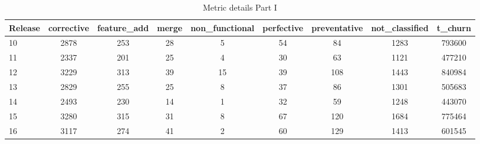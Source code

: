 \appendix{}
\label{sec:appendix}

\begin{table*}[!hbt]
      \begin{center}
            \caption{Metric details Part I}
            \label{tab:metrics_details_1}
            \begin{tabular}{l| c c c c c c c c}
            \toprule
            \textbf{Release}  & \textbf{corrective} & \textbf{feature\_add} & \textbf{merge} & \textbf{non\_functional} & \textbf{perfective} & \textbf{preventative}  & \textbf{not\_classified}  & \textbf{t\_churn} \\ \midrule  
                  10          &                       2878 &                         253 &                    28 &                              5 &                         54 &                            84 &                     1283 &   793600 \\
                  11          &                       2337 &                         201 &                    25 &                              4 &                         30 &                            63 &                     1121 &   477210 \\
                  12          &                       3229 &                         313 &                    39 &                             15 &                         39 &                           108 &                     1443 &   840984 \\
                  13          &                       2829 &                         255 &                    25 &                              8 &                         37 &                            86 &                     1301 &   505683 \\
                  14          &                       2493 &                         230 &                    14 &                              1 &                         32 &                            59 &                     1248 &   443070 \\
                  15          &                       3280 &                         315 &                    31 &                              8 &                         67 &                           120 &                     1684 &   775464 \\
                  16          &                       3117 &                         274 &                    41 &                              2 &                         60 &                           129 &                     1413 &   601545 \\

\end{tabular}
\end{center}
\end{table*}
